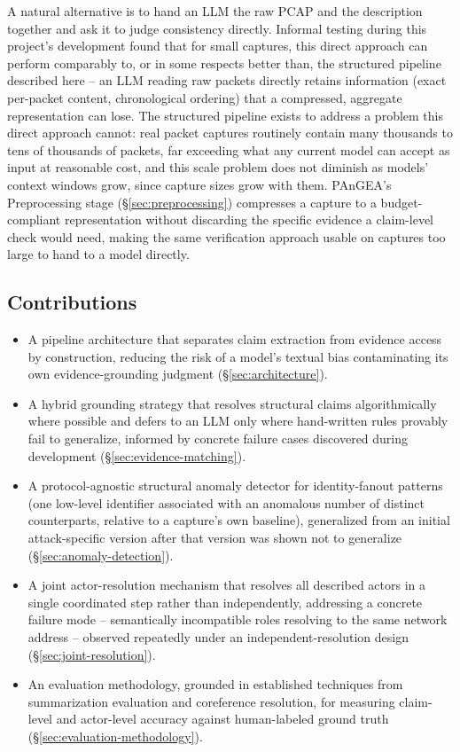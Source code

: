 \documentclass[sigconf,nonacm]{acmart}
\begin{document}
A natural alternative is to hand an LLM the raw PCAP and the description
together and ask it to judge consistency directly. Informal testing during this
project's development found that for small captures, this direct approach can
perform comparably to, or in some respects better than, the structured pipeline
described here -- an LLM reading raw packets directly retains information (exact
per-packet content, chronological ordering) that a compressed, aggregate
representation can lose. The structured pipeline exists to address a problem
this direct approach cannot: real packet captures routinely contain many
thousands to tens of thousands of packets, far exceeding what any current model
can accept as input at reasonable cost, and this scale problem does not
diminish as models' context windows grow, since capture sizes grow with them.
PAnGEA's Preprocessing stage (\S\ref{sec:preprocessing}) compresses a capture to
a budget-compliant representation without discarding the specific evidence a
claim-level check would need, making the same verification approach usable on
captures too large to hand to a model directly.

\subsection{Contributions}

\begin{itemize}
  \item A pipeline architecture that separates claim extraction from evidence access by construction, reducing the risk of a model's textual bias contaminating its own evidence-grounding judgment (\S\ref{sec:architecture}).
  \item A hybrid grounding strategy that resolves structural claims algorithmically where possible and defers to an LLM only where hand-written rules provably fail to generalize, informed by concrete failure cases discovered during development (\S\ref{sec:evidence-matching}).
  \item A protocol-agnostic structural anomaly detector for identity-fanout patterns (one low-level identifier associated with an anomalous number of distinct counterparts, relative to a capture's own baseline), generalized from an initial attack-specific version after that version was shown not to generalize (\S\ref{sec:anomaly-detection}).
  \item A joint actor-resolution mechanism that resolves all described actors in a single coordinated step rather than independently, addressing a concrete failure mode -- semantically incompatible roles resolving to the same network address -- observed repeatedly under an independent-resolution design (\S\ref{sec:joint-resolution}).
  \item An evaluation methodology, grounded in established techniques from summarization evaluation and coreference resolution, for measuring claim-level and actor-level accuracy against human-labeled ground truth (\S\ref{sec:evaluation-methodology}).
\end{itemize}
\end{document}
